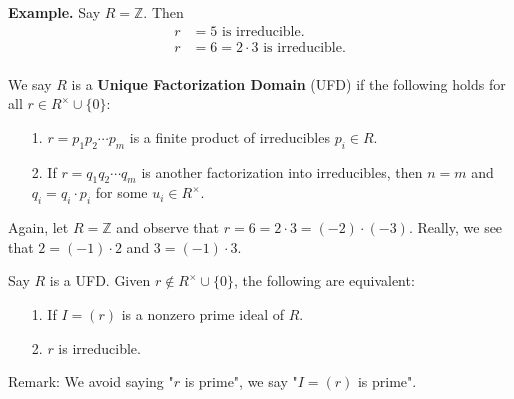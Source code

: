 \documentclass[12pt,letterpaper]{algebra_book}
\newcommand{\ZZ}{\mathbb{Z}}
\theoremstyle{definition}
\begin{document}
\textbf{Example.} Say $R = \ZZ$. Then 
\begin{align*}
    r &= 5 \text{ is irreducible.}\\
    r &= 6 = 2 \cdot 3 \text{ is irreducible.}\\
\end{align*}

\begin{definition}
    We say $R$ is a \textbf{Unique Factorization Domain} (UFD) if
    the following holds for all $r \in  R^{\times} \cup \{0\}$:
    \begin{itemize}
        \item[1.] $r = p_1p_2\cdots p_m$ is  a finite product of
        irreducibles $p_i \in R$.
        \item[2.] If $r = q_1q_2\cdots q_m$ is another
        factorization into irreducibles, then $n = m$ and $q_i=q_i
        \cdot p_i$ for some $u_i \in R^{\times}$. 
    \end{itemize}
\end{definition}
Again, let $R = \ZZ$ and observe that  $r = 6 = 2 \cdot 3 =
(-2)\cdot(-3)$. Really, we see that $2 = (-1)\cdot 2$ and $3 =
(-1)\cdot 3$. 

\begin{proposition}
    Say $R$ is a UFD. Given $r \not\in R^{\times}
    \cup\{0\}$, the following are equivalent:
    \begin{itemize}
        \item[1.] If $I = (r)$ is a nonzero prime ideal of $R$.
        \item[2.] $r$ is irreducible.  
    \end{itemize}
\end{proposition}
Remark: We avoid saying "$r$ is prime", we say "$I = (r)$ is
prime".
\end{document}
